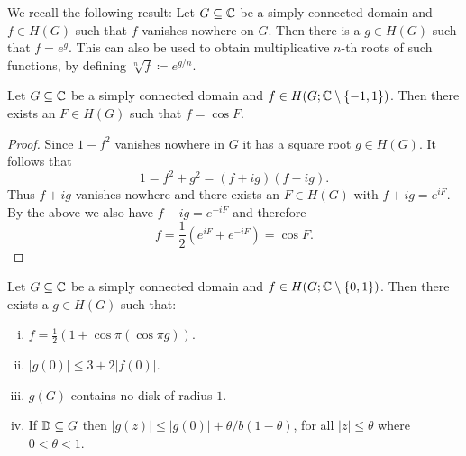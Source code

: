 We recall the following result: Let $G \subseteq \mathbb{C}$ be a simply connected domain and $f \in H(G)$ such that $f$ vanishes nowhere on $G$. Then there is a $g \in H(G)$ such that $f = e^g$. This can also be used to obtain multiplicative $n$-th roots of such functions, by defining $\sqrt[n]{f} \coloneqq e^{g/n}$.

\begin{lemma} \label{lem:schottky-2}
    Let $G \subseteq \mathbb{C}$ be a simply connected domain and $f \in H(G; \mathbb{C} \setminus \{ -1, 1 \})$. Then there exists an $F \in H(G)$ such that $f = \cos F$.
\end{lemma}

\begin{proof}
    Since $1 - f^2$ vanishes nowhere in $G$ it has a square root $g \in H(G)$. It follows that
    \begin{equation*}
        1 = f^2 + g^2 = (f + ig)(f - ig).
    \end{equation*}
    Thus $f + ig$ vanishes nowhere and there exists an $F \in H(G)$ with $f + ig = e^{iF}$. By the above we also have $f - ig = e^{-iF}$ and therefore
    $$ f = {\textstyle \frac{1}{2}} (e^{iF} + e^{-iF}) = \cos F. $$
\end{proof}

\begin{lemma} \label{lem:schottky-3}
    Let $G \subseteq \mathbb{C}$ be a simply connected domain and $f \in H(G; \mathbb{C} \setminus \{ 0, 1 \})$. Then there exists a $g \in H(G)$ such that:
    \begin{enumerate}[i.]
        \item $f = \frac{1}{2} ( 1 + \cos \pi (\cos \pi g))$.
        \item $\vert g(0) \vert \leq 3 + 2 \vert f(0) \vert$.
        \item $g(G)$ contains no disk of radius $1$.
        \item If $\mathbb{D} \subseteq G$ then $\vert g(z) \vert \leq \vert g(0) \vert + \theta / b (1 - \theta)$, for all $\vert z \vert \leq \theta$ where $0 < \theta < 1$.
    \end{enumerate}
\end{lemma}

